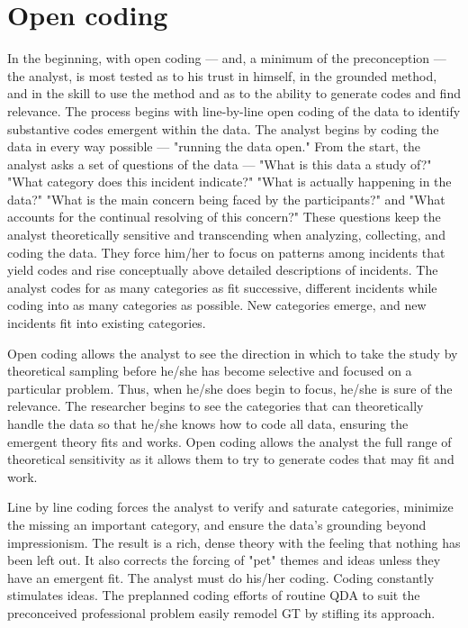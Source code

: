 \section*{Open coding}

In the beginning, with open coding --- and, a minimum of the preconception --- the analyst, is most tested as to his trust in himself, in the grounded method, and in the skill to use the method and as to the ability to generate codes and find relevance. 
The process begins with line-by-line open coding of the data to
identify substantive codes emergent within the data. 
The analyst begins by coding the data in every way possible --- "running the data open."
From the start, the analyst asks a set of questions of the data --- "What is this data a study of?"
"What category does this incident indicate?"
"What is actually happening in the data?" 
"What is the main concern being faced by the participants?" 
and 
"What accounts for the continual resolving of this concern?" 
These questions keep the analyst theoretically sensitive and transcending when analyzing, collecting, and coding the data. 
They force him/her to focus on patterns among incidents that yield codes and rise conceptually above detailed descriptions of incidents. 
The analyst codes for as many categories as fit successive, different incidents while coding into as many categories as possible. 
New categories emerge, and new incidents fit into existing categories.

Open coding allows the analyst to see the direction in which to take the study by theoretical sampling before he/she has become selective and focused on a particular problem. 
Thus, when he/she does begin to focus, he/she is sure of the relevance. 
The researcher begins to see the categories that can theoretically handle the data so that he/she knows how to code all data, ensuring the emergent theory fits and works. 
Open coding allows the analyst the full range of theoretical sensitivity as it allows them to try to generate codes that may fit and work.

Line by line coding forces the analyst to verify and saturate categories, minimize the missing an important category, and ensure the data's grounding beyond impressionism. 
The result is a rich, dense theory with the feeling that nothing has been left out. 
It also corrects the forcing of "pet" themes and ideas unless they have an emergent fit. 
The analyst must do his/her coding. 
Coding constantly stimulates ideas. 
The preplanned coding efforts of routine QDA to suit the preconceived professional problem easily remodel GT by stifling its approach.

